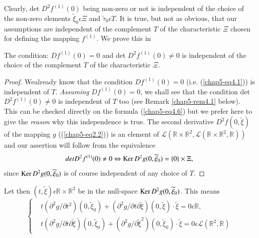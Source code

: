 Clearly, det $D^{2}f^{(1)} (0)$ being non-zero or not is independent
of the choice of the non-zero elements $\widetilde{\xi}_{0} \epsilon
\Xi$ and $\widetilde{\tau}_{0} \epsilon T$. It is true, but not as
obvious, that our assumptions are independent of the complement $T$ of
the characteristic $\Xi$ chosen for defining the mapping $f^{(1)}$. We
prove this in

\begin{proposition}\label{chap5-prop4.1}
The condition: $Df^{(1)} (0) = 0$ and det $D^{2}f^{(1)} (0) \neq 0$
is independent of the choice of the complement $T$ of the characteristic $\Xi$.
\end{proposition}

\begin{proof}
We\pageoriginale already know that the condition $Df^{(1)} (0) = 0$
(i.e. (\ref{chap5-eq4.1})) is independent of $T$. {\em Assuming}
$Df^{(1)}(0) = 0$, we shall see that the condition det
$D^{2}f^{(1)}(0) \neq 0$ is independent of $T$ too (see Remark
\ref{chap5-rem4.1} below). This can be checked directly on the formula
(\ref{chap5-eq4.6}) but we prefer here to give the {\em reason} why
this independence is true. The second derivative $D^{2}f(0,
\widetilde{\xi})$ of the mapping $g$ ((\ref{chap5-eq2.2})) is an element
of $\mathscr{L}(\mathbb{R} \times \mathbb{R}^{2},
\mathscr{L}(\mathbb{R} \times \mathbb{R}^{2}, \mathbb{R}))$ and our
assertion will follow from the equivalence
$$
det D^{2}f^{(1)}(0) \neq 0 \Leftrightarrow \operatorname{Ker} D^{2}g(0,
\widetilde{\xi}_{0}) = \{0\} \times \Xi,
$$
since $\operatorname{Ker} D^{2}g(0, \widetilde{\xi}_{0})$ is of course independent of
any choice of $T$.
\end{proof}

Let then $(t, \widetilde{\xi}) \epsilon \mathbb{R} \times
\mathbb{R}^{2}$ be in the null-space $\operatorname{Ker} D^{2}g(0,
\widetilde{\xi}_{0})$. This means
\begin{equation*}
\begin{cases}
& t(\partial^{2} g / \partial t^{2})(0, \widetilde{\xi}_{0}) +
  (\partial^{2}g/\partial t \partial \widetilde{\xi})(0,
  \widetilde{\xi}) \cdot \widetilde{\xi} =  0 \epsilon \mathbb{R},\\
& t(\partial^{2}g / \partial t \partial \widetilde{\xi})(0,
  \widetilde{\xi}_{0}) + (\partial^{2}g/\partial
  \widetilde{\xi}^{2})(0, \widetilde{\xi}_{0}) \cdot \widetilde{\xi} =
  0 \epsilon \mathscr{L}(\mathbb{R}^{2}, \mathbb{R})
\end{cases}\tag{4.7}\label{chap5-eq4.7}
\end{equation*}

